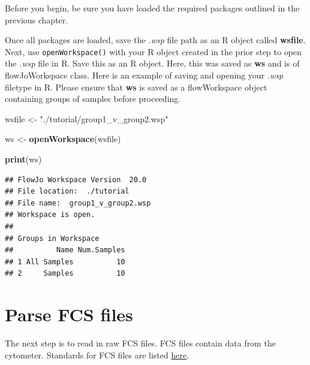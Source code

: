 \documentclass[]{book}
\newenvironment{Shaded}{\begin{snugshade}}{\end{snugshade}}
\newcommand{\KeywordTok}[1]{\textcolor[rgb]{0.13,0.29,0.53}{\textbf{#1}}}
\newcommand{\NormalTok}[1]{#1}
\newcommand{\StringTok}[1]{\textcolor[rgb]{0.31,0.60,0.02}{#1}}
\begin{document}
Before you begin, be sure you have loaded the required packages outlined in the previous chapter.

Once all packages are loaded, save the \emph{.wsp} file path as an R object called \textbf{wsfile}. Next, use \texttt{openWorkspace()} with your R object created in the prior step to open the \emph{.wsp} file in R. Save this as an R object. Here, this was saved as \textbf{ws} and is of flowJoWorkspace class. Here is an example of saving and opening your \emph{.wsp} filetype in R. Please ensure that \textbf{ws} is saved as a flowWorkspace object containing groups of samples before proceeding.

\begin{Shaded}
\begin{Highlighting}[]
\NormalTok{wsfile <-}\StringTok{ "./tutorial/group1_v_group2.wsp"}
\end{Highlighting}
\end{Shaded}

\begin{Shaded}
\begin{Highlighting}[]
\NormalTok{ws <-}\StringTok{ }\KeywordTok{openWorkspace}\NormalTok{(wsfile)}
\end{Highlighting}
\end{Shaded}

\begin{Shaded}
\begin{Highlighting}[]
\KeywordTok{print}\NormalTok{(ws)}
\end{Highlighting}
\end{Shaded}

\begin{verbatim}
## FlowJo Workspace Version  20.0 
## File location:  ./tutorial 
## File name:  group1_v_group2.wsp 
## Workspace is open. 
## 
## Groups in Workspace
##          Name Num.Samples
## 1 All Samples          10
## 2     Samples          10
\end{verbatim}

\hypertarget{parse-fcs-files}{%
\section{Parse FCS files}\label{parse-fcs-files}}

The next step is to read in raw FCS files. FCS files contain data from the cytometer. Standards for FCS files are listed \href{http://software.broadinstitute.org/cancer/software/genepattern/attachments/fcs_3_1_standard.pdf}{here}.
\end{document}
